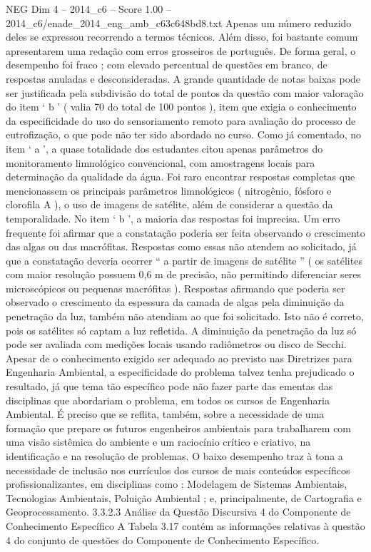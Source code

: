 \begin{textsample}{NEG Dim 4 – 2014\_c6 – Score 1.00 – 2014\_c6/enade\_2014\_eng\_amb\_c63c648bd8.txt}
Apenas um número reduzido deles se expressou recorrendo a termos técnicos.
Além disso, foi bastante comum apresentarem uma redação com erros grosseiros de português.
De forma geral, o desempenho foi fraco ; com elevado percentual de questões em branco, de respostas anuladas e desconsideradas.
A grande quantidade de notas baixas pode ser justificada pela subdivisão do total de pontos da questão com maior valoração do item ‘ b ’ ( valia 70 do total de 100 pontos ), item que exigia o conhecimento da especificidade do uso do sensoriamento remoto para avaliação do processo de eutrofização, o que pode não ter sido abordado no curso.
Como já comentado, no item ‘ a ’, a quase totalidade dos estudantes citou apenas parâmetros do monitoramento limnológico convencional, com amostragens locais para determinação da qualidade da água.
Foi raro encontrar respostas completas que mencionassem os principais parâmetros limnológicos ( nitrogênio, fósforo e clorofila A ), o uso de imagens de satélite, além de considerar a questão da temporalidade.
No item ‘ b ’, a maioria das respostas foi imprecisa.
Um erro frequente foi afirmar que a constatação poderia ser feita observando o crescimento das algas ou das macrófitas.
Respostas como essas não atendem ao solicitado, já que a constatação deveria ocorrer “ a partir de imagens de satélite ” ( os satélites com maior resolução possuem 0,6 m de precisão, não permitindo diferenciar seres microscópicos ou pequenas macrófitas ).
Respostas afirmando que poderia ser observado o crescimento da espessura da camada de algas pela diminuição da penetração da luz, também não atendiam ao que foi solicitado.
Isto não é correto, pois os satélites só captam a luz refletida.
A diminuição da penetração da luz só pode ser avaliada com medições locais usando radiômetros ou disco de Secchi.
Apesar de o conhecimento exigido ser adequado ao previsto nas Diretrizes para Engenharia Ambiental, a especificidade do problema talvez tenha prejudicado o resultado, já que tema tão específico pode não fazer parte das ementas das disciplinas que abordariam o problema, em todos os cursos de Engenharia Ambiental.
É preciso que se reflita, também, sobre a necessidade de uma formação que prepare os futuros engenheiros ambientais para trabalharem com uma visão sistêmica do ambiente e um raciocínio crítico e criativo, na identificação e na resolução de problemas.
O baixo desempenho traz à tona a necessidade de inclusão nos currículos dos cursos de mais conteúdos específicos profissionalizantes, em disciplinas como : Modelagem de Sistemas Ambientais, Tecnologias Ambientais, Poluição Ambiental ; e, principalmente, de Cartografia e Geoprocessamento. 3.3.2.3 Análise da Questão Discursiva 4 do Componente de Conhecimento Específico A Tabela 3.17 contém as informações relativas à questão 4 do conjunto de questões do Componente de Conhecimento Específico.

\end{textsample}
